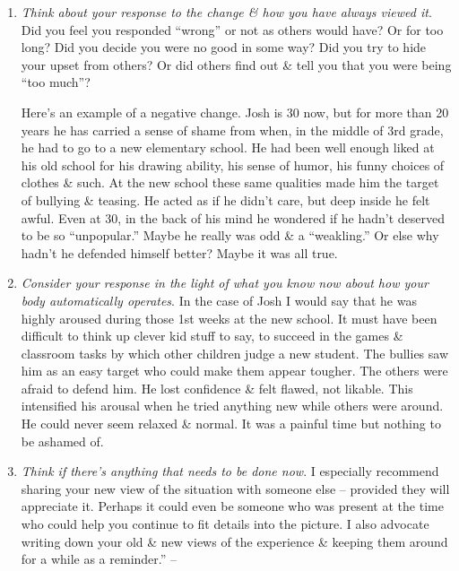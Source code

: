 \documentclass{article}
\numberwithin{equation}{section}
\begin{document}
\begin{enumerate}
	\item \textit{Think about your response to the change \& how you have always viewed it}. Did you feel you responded ``wrong'' or not as others would have? Or for too long? Did you decide you were no good in some way? Did you try to hide your upset from others? Or did others find out \& tell you that you were being ``too much''?
	
	Here's an example of a negative change. Josh is 30 now, but for more than 20 years he has carried a sense of shame from when, in the middle of 3rd grade, he had to go to a new elementary school. He had been well enough liked at his old school for his drawing ability, his sense of humor, his funny choices of clothes \& such. At the new school these same qualities made him the target of bullying \& teasing. He acted as if he didn't care, but deep inside he felt awful. Even at 30, in the back of his mind he wondered if he hadn't deserved to be so ``unpopular.'' Maybe he really was odd \& a ``weakling.'' Or else why hadn't he defended himself better? Maybe it was all true.
	\item \textit{Consider your response in the light of what you know now about how your body automatically operates}. In the case of Josh I would say that he was highly aroused during those 1st weeks at the new school. It must have been difficult to think up clever kid stuff to say, to succeed in the games \& classroom tasks by which other children judge a new student. The bullies saw him as an easy target who could make them appear tougher. The others were afraid to defend him. He lost confidence \& felt flawed, not likable. This intensified his arousal when he tried anything new while others were around. He could never seem relaxed \& normal. It was a painful time but nothing to be ashamed of.
	\item \textit{Think if there's anything that needs to be done now}. I especially recommend sharing your new view of the situation with someone else -- provided they will appreciate it. Perhaps it could even be someone who was present at the time who could help you continue to fit details into the picture. I also advocate writing down your old \& new views of the experience \& keeping them around for a while as a reminder.'' -- \cite[pp. 54--56]{Aron2013}
\end{enumerate}

\end{document}
